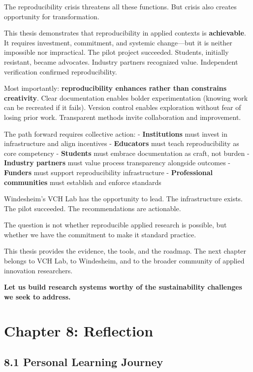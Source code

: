\documentclass[
  oneside,
  open=any]{scrbook}
\begin{document}
The reproducibility crisis threatens all these functions. But crisis
also creates opportunity for transformation.

This thesis demonstrates that reproducibility in applied contexts is
\textbf{achievable}. It requires investment, commitment, and systemic
change---but it is neither impossible nor impractical. The pilot project
succeeded. Students, initially resistant, became advocates. Industry
partners recognized value. Independent verification confirmed
reproducibility.

Most importantly: \textbf{reproducibility enhances rather than
constrains creativity}. Clear documentation enables bolder
experimentation (knowing work can be recreated if it fails). Version
control enables exploration without fear of losing prior work.
Transparent methods invite collaboration and improvement.

The path forward requires collective action: - \textbf{Institutions}
must invest in infrastructure and align incentives - \textbf{Educators}
must teach reproducibility as core competency - \textbf{Students} must
embrace documentation as craft, not burden - \textbf{Industry partners}
must value process transparency alongside outcomes - \textbf{Funders}
must support reproducibility infrastructure - \textbf{Professional
communities} must establish and enforce standards

Windesheim's VCH Lab has the opportunity to lead. The infrastructure
exists. The pilot succeeded. The recommendations are actionable.

The question is not whether reproducible applied research is possible,
but whether we have the commitment to make it standard practice.

This thesis provides the evidence, the tools, and the roadmap. The next
chapter belongs to VCH Lab, to Windesheim, and to the broader community
of applied innovation researchers.

\textbf{Let us build research systems worthy of the sustainability
challenges we seek to address.}

\chapter{Chapter 8: Reflection}\label{chapter-8-reflection}

\section{8.1 Personal Learning Journey}\label{personal-learning-journey}
\end{document}
